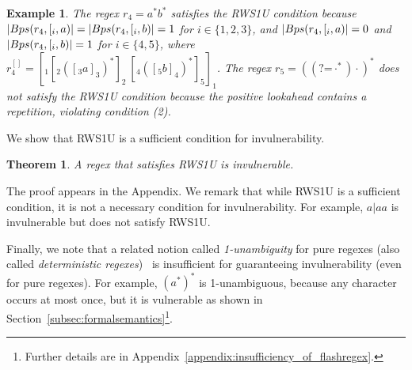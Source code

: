 \documentclass[conference]{IEEEtran}
\newcommand{\any}{\cdot}
\newcommand{\computePath}{{\sc Bps}}
\newcommand{\ltp}{RWS1U}
\newcommand{\supplementary}{Appendix} \newcommand{\Supplementary}{Appendix} \newtheorem{definition}{Definition}[section]
\newtheorem{theorem}{Theorem}[section]
\newtheorem{example}{Example}[section]
\begin{document}
\begin{example}
\normalfont
The regex $r_4 = a^*b^*$ satisfies the \ltp{} condition because $|\computePath(r_4, [_i, a)| = |\computePath(r_4, [_i, b)| = 1$ for $i \in \{1,2,3\}$, and $|\computePath(r_4, [_i, a)| = 0$ and $|\computePath(r_4, [_i, b)| = 1$ for $i \in \{4,5\}$, where 
$r_4^{[]} = [_1[_2([_3 a ]_3)^*]_2\: [_4([_5 b ]_4)^*]_5 ]_1$.  The regex $r_5 = ((\mbox{?=}\any^*)\any)^*$  does not satisfy the \ltp{} condition because the positive lookahead contains a repetition, violating condition (2).
\end{example}








We show that \ltp{} is a sufficient condition for invulnerability.
\begin{theorem}
\label{theo:numstlin}
A regex that satisfies \ltp{} is invulnerable.
\end{theorem}
The proof appears in the \supplementary{}.
We remark that while \ltp{} is a sufficient condition, it is not a necessary condition for invulnerability.  For example, $a|aa$ is invulnerable but does not satisfy \ltp{}.  

Finally, we note that a related notion called {\em 1-unambiguity} for pure regexes (also called {\em deterministic regexes})~\cite{BRUGGEMANNKLEIN1998182,FlashRegex,10.1007/3-540-57273-2_45} is insufficient for guaranteeing invulnerability (even for pure regexes).  For example, $(a^*)^*$ is 1-unambiguous, because any character occurs at most once, but it is vulnerable as shown in Section~\ref{subsec:formalsemantics}\footnote{Further details are in Appendix~\ref{appendix:insufficiency_of_flashregex}.}.
\end{document}
